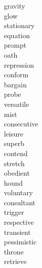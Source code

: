 \documentclass[a4paper, 10pt]{ctexart}
\begin{document}
\begin{multicols*}{2}
\begin{description}
\item[gravity]

\item[glow]

\item[stationary]

\item[equation]

\item[prompt]

\item[oath]

\item[repression]

\item[conform]

\item[bargain]

\item[probe]

\item[versatile]

\item[mist]

\item[consecutive]

\item[leisure]

\item[superb]

\item[contend]

\item[stretch]

\item[obedient]

\item[hound]

\item[voluntary]

\item[consultant]

\item[trigger]

\item[respective]

\item[transient]

\item[pessimistic]

\item[throne]

\item[retrieve]


\end{description}
\end{multicols*}
\end{document}
